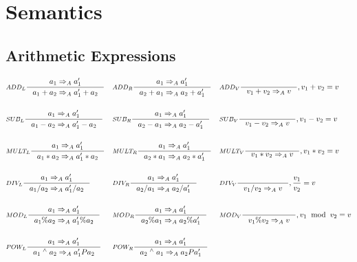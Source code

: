 \section{Semantics}
\subsection{Arithmetic Expressions}
\begin{align*}
&\inference[$ADD_L$]{a_1 \Rightarrow_A a_1'}
                    {a_1 + a_2 \Rightarrow_A a_1' + a_2}
&
&\inference[$ADD_R$]{a_1 \Rightarrow_A a_1'}
										{a_2 + a_1 \Rightarrow_A a_2 + a_1'}
&
&\inference[$ADD_V$]{}
                    {v_1 + v_2 \Rightarrow_A v}
										{, v_1 + v_2 = v}
\\\\
&\inference[$SUB_L$]{a_1 \Rightarrow_A a_1'}
                    {a_1 - a_2 \Rightarrow_A a_1' - a_2}
&
&\inference[$SUB_R$]{a_1 \Rightarrow_A a_1'}
                    {a_2 - a_1 \Rightarrow_A a_2 - a_1'}
&
&\inference[$SUB_V$]{}
                    {v_1 - v_2 \Rightarrow_A v}
										{, v_1 - v_2 = v}
\\\\
&\inference[$MULT_L$]{a_1 \Rightarrow_A a_1'}
                     {a_1 * a_2 \Rightarrow_A a_1' * a_2}
&
&\inference[$MULT_R$]{a_1 \Rightarrow_A a_1'}
                     {a_2 * a_1 \Rightarrow_A a_2 * a_1'}
&
&\inference[$MULT_V$]{}
                     {v_1 * v_2 \Rightarrow_A v}
										 {, v_1 * v_2 = v}
\\\\
&\inference[$DIV_L$]{a_1 \Rightarrow_A a_1'}
                    {a_1 / a_2 \Rightarrow_A a_1' / a_2}
&
&\inference[$DIV_R$]{a_1 \Rightarrow_A a_1'}
                    {a_2 / a_1 \Rightarrow_A a_2 / a_1'}
&
&\inference[$DIV_V$]{}
                    {v_1 / v_2 \Rightarrow_A v}
										{, \frac{v_1}{v_2} = v}
\\\\
&\inference[$MOD_L$]{a_1 \Rightarrow_A a_1'}
                    {a_1 \% a_2 \Rightarrow_A a_1' \% a_2}
&
&\inference[$MOD_R$]{a_1 \Rightarrow_A a_1'}
                    {a_2 \% a_1 \Rightarrow_A a_2 \% a_1'}
&
&\inference[$MOD_V$]{}
                    {v_1 \% v_2 \Rightarrow_A v}
										{, v_1 \;\; \textrm{mod} \;\; v_2 = v}
\\\\
&\inference[$POW_L$]{a_1  \Rightarrow_A a_1'}
                    {a_1 \; ^\wedge{} \; a_2 \Rightarrow_A a_1' P a_2}
&
&\inference[$POW_R$]{a_1 \Rightarrow_A a_1'}
                    {a_2 \; ^\wedge{} \; a_1 \Rightarrow_A a_2 P a_1'}

\end{align*}
